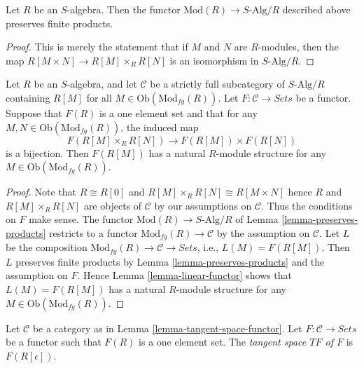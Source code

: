 \begin{lemma}
\label{lemma-preserves-products}
Let $R$ be an $S$-algebra. Then the functor
$\text{Mod}(R) \to S\text{-Alg}/R$ described above preserves finite products.
\end{lemma}

\begin{proof}
This is merely the statement that if $M$ and $N$ are $R$-modules, then the map 
$R[M \times N] \to R[M] \times_{R} R[N]$ is an isomorphism in
$S\text{-Alg}/R$.
\end{proof}

\begin{lemma}
\label{lemma-tangent-space-functor}
Let $R$ be an $S$-algebra, and let $\mathcal{C}$ be a strictly full
subcategory of $S\text{-Alg}/R$ containing $R[M]$ for all
$M \in \text{Ob}(\text{Mod}_{fg}(R))$.  
Let $F: \mathcal{C} \to \textit{Sets}$ be a functor. Suppose that 
$F(R)$ is a one element set and that for any $M, N \in 
\text{Ob}(\text{Mod}_{fg}(R))$, the induced map 
$$
F(R[M] \times_{R} R[N]) \to F(R[M]) \times F(R[N])
$$
is a bijection. Then $F(R[M])$ has a natural $R$-module structure for any $M 
\in \text{Ob}(\text{Mod}_{fg}(R))$.
\end{lemma}

\begin{proof}
Note that $R \cong R[0]$ and $R[M] \times_R R[N] \cong R[M \times N]$ hence
$R$ and $R[M] \times_R R[N]$ are objects of $\mathcal{C}$ by our assumptions on
$\mathcal{C}$. Thus the conditions on $F$ make sense.
The functor $\text{Mod}(R) \to S\text{-Alg}/R$ of
Lemma \ref{lemma-preserves-products}
restricts to a functor $\text{Mod}_{fg}(R) \to \mathcal{C}$
by the assumption on $\mathcal{C}$. Let $L$ be the composition
$\text{Mod}_{fg}(R) \to \mathcal{C} \to \textit{Sets}$, i.e.,
$L(M) = F(R[M])$.
Then $L$ preserves finite products by
Lemma \ref{lemma-preserves-products}
and the assumption on $F$. Hence
Lemma \ref{lemma-linear-functor}
shows that $L(M) = F(R[M])$ has a natural $R$-module structure for any
$M \in \text{Ob}(\text{Mod}_{fg}(R))$.
\end{proof}

\begin{definition}
\label{definition-tangent-space-over-R}
Let $\mathcal{C}$ be a category as in
Lemma \ref{lemma-tangent-space-functor}.  
Let $F : \mathcal{C} \to \textit{Sets}$ be a functor such that 
$F(R)$ is a one element set. The {\it tangent space $TF$ of $F$} is
$F(R[\epsilon])$.
\end{definition}

